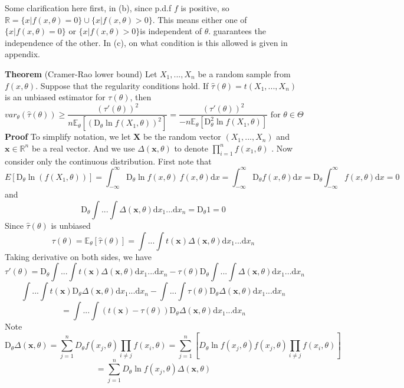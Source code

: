 \documentclass[a4paper,12pt]{article}
\begin{document}
Some clarification here first, in (b), since p.d.f $f$ is positive, so $ \mathbb{R} = \{ x | f(x, \theta) = 0 \} \cup \{ x | f(x, \theta) > 0 \}$. This means either one of $\{ x | f(x, \theta) = 0 \}$ or $\{ x | f(x, \theta) > 0 \}$is independent of $\theta$.
 guarantees the independence of the other. In (c), on what condition is this allowed is given in appendix.  
 
\textbf{Theorem} (Cramer-Rao lower bound) Let $X_1, ..., X_n$ be a random sample from $f(x, \theta)$. Suppose that the regularity conditions hold. If $\hat{\tau}(\theta) = t(X_1, ..., X_n)$ is an unbiased estimator for $\tau(\theta)$, then
$$var_\theta(\hat{\tau}(\theta)) \geq \frac{(\tau'(\theta))^2}{n\mathbb{E}_\theta
[(\mathrm{D}_\theta \ln f(X_1, \theta))^2]} = \frac{(\tau'(\theta))^2}{-n\mathbb{E}_\theta
[\mathrm{D}_\theta^2 \ln f(X_1, \theta)]} \text{ for } \theta\in\Theta$$
\textbf{Proof} To simplify notation, we let $\textbf{X}$ be the random vector $(X_1, ..., X_n)$ and $\textbf{x} \in \mathbb{R}^n$ be a real vector. And we use $\Delta(\textbf{x},\theta)$ to denote $\prod_{i=1}^n f(x_1, \theta)$ . Now consider only the continuous distribution. First note that
$$E[\mathrm{D}_\theta \ln(f(X_1, \theta))] = \int_{-\infty}^\infty \mathrm{D}_\theta \ln{f(x, \theta)}\ f(x, \theta) \mathrm{d}x = \int_{-\infty}^\infty \mathrm{D}_\theta f(x, \theta) \mathrm{d}x = \mathrm{D}_\theta \int_{-\infty}^\infty f(x, \theta) \mathrm{d}x = 0$$
and $$\mathrm{D}_\theta \int ... \int \Delta(\textbf{x},\theta) \mathrm{d}x_1...\mathrm{d}x_n = \mathrm{D}_\theta 1 = 0$$
Since $\hat{\tau}(\theta)$ is unbiased
$$\tau(\theta) = \mathbb{E}_\theta[\hat{\tau}(\theta)] = \int ... \int t(\textbf{x}) \Delta(\textbf{x},\theta) \mathrm{d}x_1...\mathrm{d}x_n$$
Taking derivative on both sides, we have
$$\tau'(\theta) = \mathrm{D}_\theta \int ... \int t(\textbf{x}) \Delta(\textbf{x},\theta) \mathrm{d}x_1...\mathrm{d}x_n - \tau(\theta)\mathrm{D}_\theta \int ... \int \Delta(\textbf{x},\theta) \mathrm{d}x_1...\mathrm{d}x_n$$
$$\int ... \int t(\textbf{x}) \mathrm{D}_\theta \Delta(\textbf{x},\theta) \mathrm{d}x_1...\mathrm{d}x_n - \int ... \int \tau(\theta) \mathrm{D}_\theta \Delta(\textbf{x},\theta) \mathrm{d}x_1...\mathrm{d}x_n$$
$$= \int ... \int (t(\textbf{x}) - \tau(\theta)) \mathrm{D}_\theta \Delta(\textbf{x},\theta) \mathrm{d}x_1...\mathrm{d}x_n$$
Note $$\mathrm{D}_\theta \Delta(\textbf{x},\theta) = \sum_{j=1}^n D_\theta f(x_j, \theta)\prod_{i\neq j}f(x_i, \theta) = \sum_{j=1}^n [D_\theta \ln f(x_j, \theta) f(x_j, \theta) \prod_{i\neq j}f(x_i, \theta)]$$
$$= \sum_{j=1}^n D_\theta \ln f(x_j, \theta) \Delta(\textbf{x},\theta)$$
\end{document}
